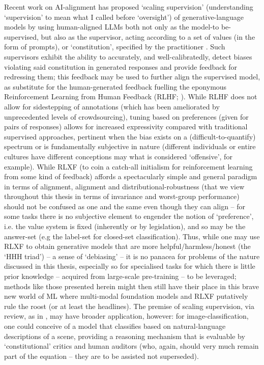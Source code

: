 %
Recent work on AI-alignment has proposed `scaling supervision' (understanding `supervision' to mean
what I called before `oversight') of generative-language models by using human-aligned LLMs both
not only as the model-to be-supervised, but also as the supervisor, acting according to a set of
values (in the form of prompts), or `constitution', specified by the practitioner
\citep{bowman2022measuring, bai2022constitutional}.
%
Such supervisors exhibit the ability to accurately, and well-calibratedly, detect biases violating
said constitution in generated responses and provide feedback for redressing them; this feedback
may be used to further align the supervised model, as substitute for the human-generated feedback
fuelling the eponymous Reinforcement Learning from Human Feedback (RLHF; \cite{christiano2017deep,
stiennon2020learning, bai2022training}).
%
While RLHF does not allow for sidestepping of annotations (which has been ameliorated by
unprecedented levels of crowdsourcing), tuning based on preferences (given for pairs of responses)
allows for increased expressivity compared with traditional supervised approaches, pertinent when
the bias exists on a (difficult-to-quantify) spectrum or is fundamentally subjective in nature
(different individuals or entire cultures have different conceptions may what is considered
`offensive', for example).
%
While RLXF (to coin a catch-all initialism for reinforcement learning from some kind of feedback)
affords a spectacularly simple and general paradigm in terms of alignment, alignment and
distributional-robustness (that we view throughout this thesis in terms of invariance and
worst-group performance) should not be confused as one and the same even though they can align --
for some tasks there is no subjective element to engender the notion of `preference', i.e. the
value system is fixed (inherently or by legislation), and so may be the answer-set (e.g the
label-set for closed-set classification). 
%
Thus, while one may use RLXF to obtain generative models that are more helpful/harmless/honest
(the `HHH triad') -- a sense of `debiasing' -- it is no panacea for problems of the nature discussed in this
thesis, especially so for specialised tasks for which there is little prior knowledge -- acquired
from large-scale pre-training -- to be leveraged; methods like those presented herein might then
still have their place in this brave new world of ML where multi-modal foundation models and RLXF
putatively rule the roost (or at least the headlines).
%
The premise of scaling supervision, via review, as in \cite{bai2022constitutional}, may have
broader application, however: for image-classification, one could conceive of a model that
classifies based on natural-language descriptions of a scene, providing a reasoning mechanism that
is evaluable by `constitutional' critics and human auditors (who, again, should very much remain
part of the equation -- they are to be assisted not superseded).
%

